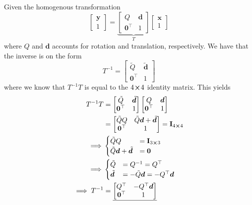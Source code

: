\documentclass[a4paper]{article}
\begin{document}
Given the homogenous transformation
\begin{equation}
    \begin{bmatrix}
        \bm{y} \\ 1
    \end{bmatrix} = 
    \underbrace{\begin{bmatrix}
        Q & \bm{d} \\ \bm{0}^\top & 1 
    \end{bmatrix}}_{T}
    \begin{bmatrix}
        \bm{x} \\ 1
    \end{bmatrix}
\end{equation}
where $Q$ and $\bm{d}$ accounts for rotation and translation, respectively. We have that the inverse
is on the form 
\begin{equation}
        T^{-1} = \begin{bmatrix}
            \tilde{Q} & \tilde{\bm{d}} \\ \bm{0}^\top & 1
        \end{bmatrix}
\end{equation}
where we know that $T^{-1}T$ is equal to the $4\!\cross\!4$ identity matrix. This yields
\begin{equation}
    \begin{aligned}
        T^{-1}T &= \begin{bmatrix}
             \tilde{Q} & \tilde{\bm{d}} \\ \bm{0}^\top & 1
        \end{bmatrix}
        \begin{bmatrix}
            Q & \bm{d} \\ \bm{0}^\top & 1
        \end{bmatrix} \\
        &= \begin{bmatrix}
            \tilde{Q}Q & \tilde{Q}\bm{d} + \tilde{\bm{d}} \\ \bm{0}^\top & 1
        \end{bmatrix} = \mathbf{I}_{4\cross4}\\
        \implies &\begin{cases}
            \tilde{Q}Q &= \mathbf{I}_{3\cross3} \\
             \tilde{Q}\bm{d} + \tilde{\bm{d}} &= \bm{0}
        \end{cases}\\
        \implies &\begin{cases}
            \tilde{Q} &= Q^{-1} = Q^\top \\
            \tilde{\bm{d}} &= -\tilde{Q}\bm{d} = -Q^\top \bm{d}
        \end{cases}\\
        \implies T^{-1} &=\underline{ \begin{bmatrix}
            Q^\top & -Q^\top \bm{d} \\ \bm{0}^\top & 1
        \end{bmatrix}
        }
    \end{aligned}
\end{equation}
\end{document}
